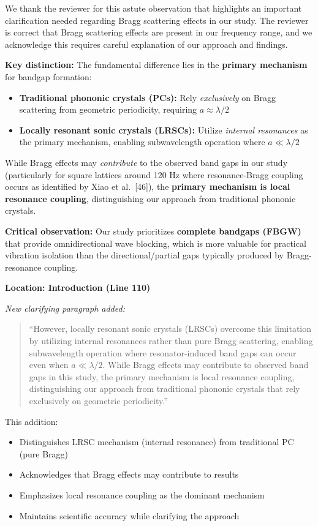 \documentclass[11pt,a4paper]{article}
\newenvironment{responsebox}{%
    \par\medskip\noindent{\color{responsecolor}\rule{\linewidth}{2pt}}\par
    \noindent{\color{responsecolor}\bfseries Response}\par\smallskip
}{%
    \par\noindent{\color{responsecolor}\rule{\linewidth}{0.5pt}}\medskip
}
\newenvironment{changesbox}{%
    \par\medskip\noindent{\color{changescolor}\rule{\linewidth}{2pt}}\par
    \noindent{\color{changescolor}\bfseries Manuscript Changes}\par\smallskip
}{%
    \par\noindent{\color{changescolor}\rule{\linewidth}{0.5pt}}\medskip
}
\begin{document}
\begin{responsebox}
We thank the reviewer for this astute observation that highlights an important clarification needed regarding Bragg scattering effects in our study. The reviewer is correct that Bragg scattering effects are present in our frequency range, and we acknowledge this requires careful explanation of our approach and findings.

\textbf{Key distinction:} The fundamental difference lies in the \textbf{primary mechanism} for bandgap formation:
\begin{itemize}
    \item \textbf{Traditional phononic crystals (PCs):} Rely \textit{exclusively} on Bragg scattering from geometric periodicity, requiring $a \approx \lambda/2$
    \item \textbf{Locally resonant sonic crystals (LRSCs):} Utilize \textit{internal resonances} as the primary mechanism, enabling subwavelength operation where $a \ll \lambda/2$
\end{itemize}

While Bragg effects may \textit{contribute} to the observed band gaps in our study (particularly for square lattices around 120 Hz where resonance-Bragg coupling occurs as identified by Xiao et al.~[46]), the \textbf{primary mechanism is local resonance coupling}, distinguishing our approach from traditional phononic crystals.

\textbf{Critical observation:} Our study prioritizes \textbf{complete bandgaps (FBGW)} that provide omnidirectional wave blocking, which is more valuable for practical vibration isolation than the directional/partial gaps typically produced by Bragg-resonance coupling.
\end{responsebox}

\begin{changesbox}
\textbf{Location: Introduction (Line 110)}

\textit{New clarifying paragraph added:}
\begin{quote}
\textcolor{redtext}{``However, locally resonant sonic crystals (LRSCs) overcome this limitation by utilizing internal resonances rather than pure Bragg scattering, enabling subwavelength operation where resonator-induced band gaps can occur even when $a \ll \lambda/2$. While Bragg effects may contribute to observed band gaps in this study, the primary mechanism is local resonance coupling, distinguishing our approach from traditional phononic crystals that rely exclusively on geometric periodicity.''}
\end{quote}

This addition:
\begin{itemize}
    \item Distinguishes LRSC mechanism (internal resonance) from traditional PC (pure Bragg)
    \item Acknowledges that Bragg effects may contribute to results
    \item Emphasizes local resonance coupling as the dominant mechanism
    \item Maintains scientific accuracy while clarifying the approach
\end{itemize}
\end{changesbox}
\end{document}
